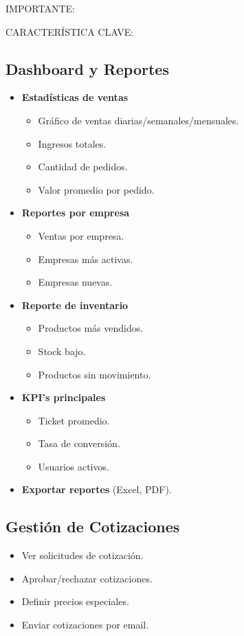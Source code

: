 \documentclass[12pt,a4paper,oneside]{book}
\begin{document}
\begin{alert}{IMPORTANTE:}
\begin{info}{CARACTERÍSTICA CLAVE:}
\subsection{Dashboard y Reportes}
\begin{itemize}
    \item \textbf{Estadísticas de ventas}
    \begin{itemize}
        \item Gráfico de ventas diarias/semanales/mensuales.
        \item Ingresos totales.
        \item Cantidad de pedidos.
        \item Valor promedio por pedido.
    \end{itemize}
    \item \textbf{Reportes por empresa}
    \begin{itemize}
        \item Ventas por empresa.
        \item Empresas más activas.
        \item Empresas nuevas.
    \end{itemize}
    \item \textbf{Reporte de inventario}
    \begin{itemize}
        \item Productos más vendidos.
        \item Stock bajo.
        \item Productos sin movimiento.
    \end{itemize}
    \item \textbf{KPI's principales}
    \begin{itemize}
        \item Ticket promedio.
        \item Tasa de conversión.
        \item Usuarios activos.
    \end{itemize}
    \item \textbf{Exportar reportes} (Excel, PDF).
\end{itemize}

\subsection{Gestión de Cotizaciones}
\begin{itemize}
    \item Ver solicitudes de cotización.
    \item Aprobar/rechazar cotizaciones.
    \item Definir precios especiales.
    \item Enviar cotizaciones por email.
\end{itemize}


\end{info}
\end{alert}
\end{document}
